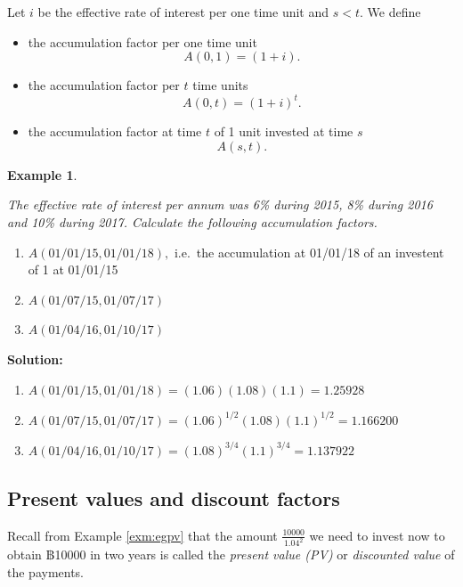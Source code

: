 \documentclass[landscape, 20pt]{extreport}
\theoremstyle{definition}
\theoremstyle{definition}
\newtheorem{example}{Example}[chapter]
\theoremstyle{definition}
\theoremstyle{definition}
\theoremstyle{remark}
\begin{document}
Let \(i\) be the effective rate of interest per one time unit and \(s < t\).
We define

\begin{itemize}
\item
  the accumulation factor per one time unit \[A(0,1) = (1 + i).\]
\item
  the accumulation factor per \(t\) time units \[A(0,t) = (1 + i)^t.\]
\item
  the accumulation factor at time \(t\) of 1 unit invested at time \(s\)
  \[A(s,t).\]
\end{itemize}

\newpage \begin{example}
\protect\hypertarget{exm:unlabeled-div-20}{}\label{exm:unlabeled-div-20}

\emph{The effective rate of interest per annum was 6\% during 2015, 8\% during
2016 and 10\% during 2017. Calculate the following accumulation factors.}

\begin{enumerate}
\def\labelenumi{\arabic{enumi}.}
\item
  \(A(01/01/15, 01/01/18),\) i.e.~the accumulation at 01/01/18 of an
  investent of 1 at 01/01/15
\item
  \(A(01/07/15, 01/07/17)\)
\item
  \(A(01/04/16, 01/10/17)\)
\end{enumerate}

\end{example}

\textbf{Solution:}

\begin{enumerate}
\def\labelenumi{\arabic{enumi}.}
\item
  \(A(01/01/15, 01/01/18) = (1.06)(1.08)(1.1) = 1.25928\)
\item
  \(A(01/07/15, 01/07/17) = (1.06)^{1/2}(1.08)(1.1)^{1/2} = 1.166200\)
\item
  \(A(01/04/16, 01/10/17) = (1.08)^{3/4}(1.1)^{3/4} = 1.137922\)
\end{enumerate}

\hypertarget{present-values-and-discount-factors}{%
\newpage \subsection{Present values and discount factors}\label{present-values-and-discount-factors}}

Recall from Example \ref{exm:egpv} that the amount
\(\displaystyle{\frac{10000}{1.04^2}}\) we need to invest now to obtain
฿10000 in two years is called the \emph{present value (PV)} or \emph{discounted
value} of the payments.
\end{document}
